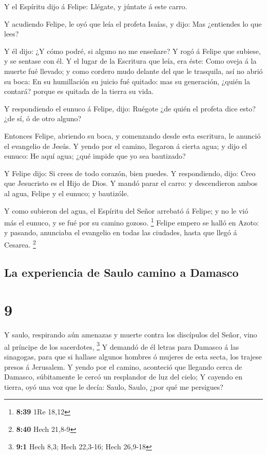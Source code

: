  Y el Espíritu dijo á Felipe: Llégate, y júntate á este
carro.

 Y acudiendo Felipe, le oyó que leía el profeta Isaías, y
dijo: Mas ¿entiendes lo que lees?

 Y él dijo: ¿Y cómo podré, si alguno no me enseñare? Y rogó
á Felipe que subiese, y se sentase con él.  Y el lugar de
la Escritura que leía, era éste: Como oveja á la muerte fué llevado; y
como cordero mudo delante del que le trasquila, así no abrió su boca:
 En su humillación su juicio fué quitado: mas su
generación, ¿quién la contará? porque es quitada de la tierra su vida.

 Y respondiendo el eunuco á Felipe, dijo: Ruégote ¿de quién
el profeta dice esto? ¿de sí, ó de otro alguno?

 Entonces Felipe, abriendo su boca, y comenzando desde esta
escritura, le anunció el evangelio de Jesús.  Y yendo por
el camino, llegaron á cierta agua; y dijo el eunuco: He aquí agua; ¿qué
impide que yo sea bautizado?

 Y Felipe dijo: Si crees de todo corazón, bien puedes. Y
respondiendo, dijo: Creo que Jesucristo es el Hijo de Dios.
 Y mandó parar el carro: y descendieron ambos al agua,
Felipe y el eunuco; y bautizóle.

 Y como subieron del agua, el Espíritu del Señor arrebató á
Felipe; y no le vió más el eunuco, y se fué por su camino gozoso.
\footnote{\textbf{8:39} 1Re 18,12}  Felipe empero se halló
en Azoto: y pasando, anunciaba el evangelio en todas las ciudades, hasta
que llegó á Cesarea. \footnote{\textbf{8:40} Hech 21,8-9}

\hypertarget{la-experiencia-de-saulo-camino-a-damasco}{%
\subsection{La experiencia de Saulo camino a
Damasco}\label{la-experiencia-de-saulo-camino-a-damasco}}

\hypertarget{section-8}{%
\section{9}\label{section-8}}

 Y saulo, respirando aún amenazas y muerte contra los
discípulos del Señor, vino al príncipe de los sacerdotes, \footnote{\textbf{9:1}
  Hech 8,3; Hech 22,3-16; Hech 26,9-18}  Y demandó de él
letras para Damasco á las sinagogas, para que si hallase algunos hombres
ó mujeres de esta secta, los trajese presos á Jerusalem.  Y
yendo por el camino, aconteció que llegando cerca de Damasco,
súbitamente le cercó un resplandor de luz del cielo;  Y
cayendo en tierra, oyó una voz que le decía: Saulo, Saulo, ¿por qué me
persigues?


